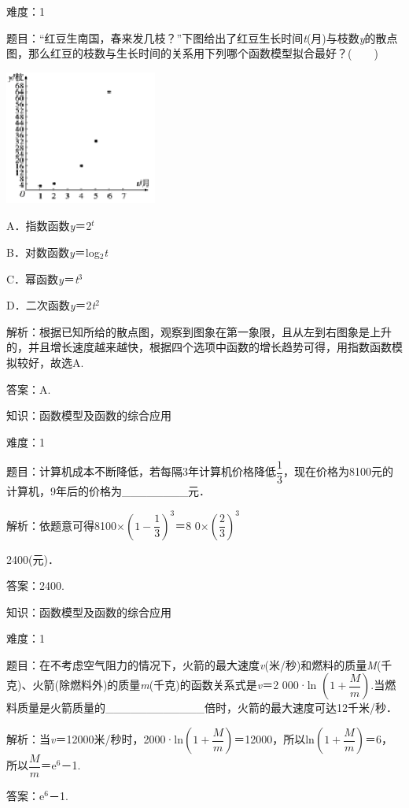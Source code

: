 \documentclass{article} %
\begin{document}
难度：1

题目：``红豆生南国，春来发几枝？''下图给出了红豆生长时间\textit{t}(月)与枝数\textit{y}的散点图，那么红豆的枝数与生长时间的关系用下列哪个函数模型拟合最好？(　　)

\includegraphics*[width=1.97in, height=1.74in, keepaspectratio=false]{image82}

A．指数函数\textit{y}＝2\textit{${}^{t}$}   

B．对数函数\textit{y}＝log${}_{2}$\textit{t}

C．幂函数\textit{y}＝\textit{t}${}^{3}$   

D．二次函数\textit{y}＝2\textit{t}${}^{2}$

解析：根据已知所给的散点图，观察到图象在第一象限，且从左到右图象是上升的，并且增长速度越来越快，根据四个选项中函数的增长趋势可得，用指数函数模拟较好，故选A.

答案：A.

知识：函数模型及函数的综合应用

难度：1

题目：计算机成本不断降低，若每隔3年计算机价格降低$\dfrac{1}{3}$，现在价格为8100元的计算机，9年后的价格为\_\_\_\_\_\_\_\_元．

解析：依题意可得8100$\mathrm{\times}$$(1-\dfrac{1}{3})^{3}$＝8 0$\mathrm{\times}$$(\dfrac{2}{3})^{3}$

2400(元)．

答案：2400.

知识：函数模型及函数的综合应用

难度：1

题目：在不考虑空气阻力的情况下，火箭的最大速度\textit{v}(米/秒)和燃料的质量\textit{M}(千克)、火箭(除燃料外)的质量\textit{m}(千克)的函数关系式是\textit{v}＝2 000·ln $(1+\dfrac{M}{m})$.当燃料质量是火箭质量的\_\_\_\_\_\_\_\_\_\_\_\_倍时，火箭的最大速度可达12千米/秒．

解析：当\textit{v}＝12000米/秒时，2000·ln$(1+\dfrac{M}{m})$＝12000，所以ln$(1+\dfrac{M}{m})$＝6，所以$\dfrac{M}{m}$＝e${}^{6}$－1.

答案：e${}^{6}$－1.
\end{document}
